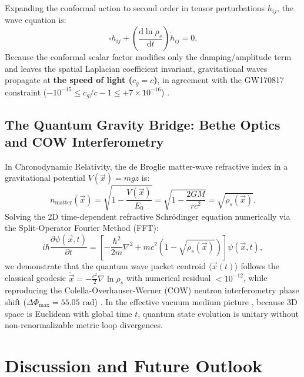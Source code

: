 \documentclass[aps,prd,reprint,superscriptaddress,nofootinbib,floatfix,amsmath,amssymb]{revtex4-2}
\begin{document}
Expanding the conformal action to second order in tensor perturbations $h_{ij}$, the wave equation is:
\begin{equation}
\square h_{ij} + \left( \frac{\mathrm{d}\ln\rho_s}{\mathrm{d}t} \right) \dot{h}_{ij} = 0.
\label{eq:gw_wave}
\end{equation}
Because the conformal scalar factor modifies only the damping/amplitude term and leaves the spatial Laplacian coefficient invariant, gravitational waves propagate at \textbf{the speed of light ($c_g = c$)}, in agreement with the GW170817 constraint ($-10^{-15} \le c_g/c - 1 \le +7\times 10^{-16}$) \cite{GW170817}.

\subsection{The Quantum Gravity Bridge: Bethe Optics and COW Interferometry}

In Chronodynamic Relativity, the de Broglie matter-wave refractive index in a gravitational potential $V(\vec{x}) = m g z$ is:
\begin{equation}
n_{\text{matter}}(\vec{x}) = \sqrt{1 - \frac{V(\vec{x})}{E_0}} = \sqrt{1 - \frac{2GM}{r c^2}} = \sqrt{\rho_s(\vec{x})}.
\label{eq:bethe_cr}
\end{equation}
Solving the 2D time-dependent refractive Schrödinger equation numerically via the Split-Operator Fourier Method (FFT):
\begin{equation}
i\hbar \frac{\partial \psi(\vec{x}, t)}{\partial t} = \left[ -\frac{\hbar^2}{2m} \nabla^2 + m c^2 (1 - \sqrt{\rho_s(\vec{x})}) \right] \psi(\vec{x}, t),
\label{eq:schrodinger}
\end{equation}
we demonstrate that the quantum wave packet centroid $\langle \vec{x}(t) \rangle$ follows the classical geodesic $\ddot{\vec{x}} = -\frac{c^2}{2}\nabla\ln\rho_s$ with numerical residual $<10^{-12}$, while reproducing the Colella-Overhauser-Werner (COW) neutron interferometry phase shift ($\Delta\Phi_{\max} = 55.05\text{ rad}$) \cite{COW1975}. In the effective vacuum medium picture \cite{Volovik2003,Horava2009}, because 3D space is Euclidean with global time $t$, quantum state evolution is unitary without non-renormalizable metric loop divergences.

\section{Discussion and Future Outlook}
\label{sec:discussion}
\end{document}

